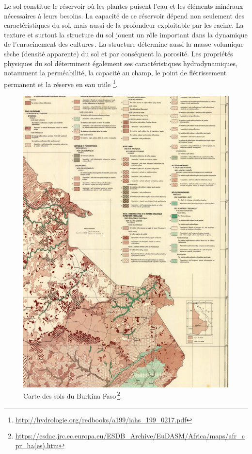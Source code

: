 \documentclass[a4paper,11pt]{article}
\begin{document}
Le sol constitue le réservoir où les plantes puisent l’eau et les
éléments minéraux nécessaires à leurs besoins. La capacité de ce
réservoir dépend non seulement des caractéristiques du sol, mais aussi
de la profondeur exploitable par les racine. La texture et surtout la
structure du sol jouent un rôle important dans la dynamique de
l’enracinement des cultures\,\cite{Chopart_1980}. La structure détermine
aussi la masse volumique sèche (densité apparente) du sol et par
conséquent la porosité. Les propriétés physiques du sol déterminent
également ses caractéristiques hydrodynamiques, notamment la
perméabilité, la capacité au champ, le point de flétrissement
permanent et la réserve en eau utile
\footnote{\url{http://hydrologie.org/redbooks/a199/iahs_199_0217.pdf}}.


\begin{figure}%
 \begin{center}
   \includegraphics[width=12cm]{images/cartepedobf}
  \end{center}
  \caption{Carte des sols du Burkina Faso\,\protect\footnote{\protect\url{https://esdac.jrc.ec.europa.eu/ESDB_Archive/EuDASM/Africa/maps/afr_cpr_ha(es).htm}}.}
\end{figure}
\end{document}
